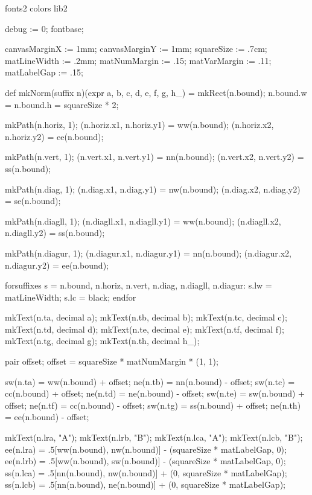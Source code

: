 \environment fonts2
\environment colors
\environment lib2


\startMPinitializations

debug := 0;
fontbase;

canvasMarginX := 1mm;
canvasMarginY := 1mm;
squareSize := .7cm;
matLineWidth := .2mm;
matNumMargin := .15;
matVarMargin := .11;
matLabelGap := .15;


def mkNorm(suffix n)(expr a, b, c, d, e, f, g, h_) =
  mkRect(n.bound);
  n.bound.w = n.bound.h = squareSize * 2;

  mkPath(n.horiz, 1);
  (n.horiz.x1, n.horiz.y1) = ww(n.bound);
  (n.horiz.x2, n.horiz.y2) = ee(n.bound);

  mkPath(n.vert, 1);
  (n.vert.x1, n.vert.y1) = nn(n.bound);
  (n.vert.x2, n.vert.y2) = ss(n.bound);

  mkPath(n.diag, 1);
  (n.diag.x1, n.diag.y1) = nw(n.bound);
  (n.diag.x2, n.diag.y2) = se(n.bound);

  mkPath(n.diagll, 1);
  (n.diagll.x1, n.diagll.y1) = ww(n.bound);
  (n.diagll.x2, n.diagll.y2) = ss(n.bound);

  mkPath(n.diagur, 1);
  (n.diagur.x1, n.diagur.y1) = nn(n.bound);
  (n.diagur.x2, n.diagur.y2) = ee(n.bound);

  forsuffixes s = n.bound, n.horiz, n.vert, n.diag, n.diagll, n.diagur:
    s.lw = matLineWidth;
    s.lc = black;
  endfor

  mkText(n.ta, decimal a);
  mkText(n.tb, decimal b);
  mkText(n.tc, decimal c);
  mkText(n.td, decimal d);
  mkText(n.te, decimal e);
  mkText(n.tf, decimal f);
  mkText(n.tg, decimal g);
  mkText(n.th, decimal h_);

  pair offset;
  offset = squareSize * matNumMargin * (1, 1);

  sw(n.ta) = ww(n.bound) + offset;
  ne(n.tb) = nn(n.bound) - offset;
  sw(n.tc) = cc(n.bound) + offset;
  ne(n.td) = ne(n.bound) - offset;
  sw(n.te) = sw(n.bound) + offset;
  ne(n.tf) = cc(n.bound) - offset;
  sw(n.tg) = ss(n.bound) + offset;
  ne(n.th) = ee(n.bound) - offset;

  mkText(n.lra, "A");
  mkText(n.lrb, "B");
  mkText(n.lca, "A");
  mkText(n.lcb, "B");
  ee(n.lra) = .5[ww(n.bound), nw(n.bound)] - (squareSize * matLabelGap, 0);
  ee(n.lrb) = .5[ww(n.bound), sw(n.bound)] - (squareSize * matLabelGap, 0);
  ss(n.lca) = .5[nn(n.bound), nw(n.bound)] + (0, squareSize * matLabelGap);
  ss(n.lcb) = .5[nn(n.bound), ne(n.bound)] + (0, squareSize * matLabelGap);

